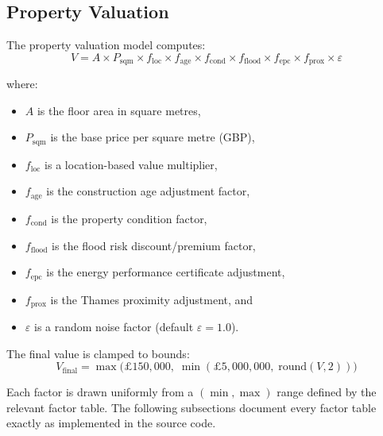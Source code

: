 \documentclass[11pt,a4paper]{article}
\begin{document}
\mkmframework

\subsection{Property Valuation}

The property valuation model computes:
\begin{equation}
\label{eq:valuation}
V = A \times P_{\mathrm{sqm}} \times f_{\mathrm{loc}} \times f_{\mathrm{age}}
    \times f_{\mathrm{cond}} \times f_{\mathrm{flood}} \times f_{\mathrm{epc}}
    \times f_{\mathrm{prox}} \times \varepsilon
\end{equation}

\noindent where:
\begin{itemize}[nosep]
    \item $A$ is the floor area in square metres,
    \item $P_{\mathrm{sqm}}$ is the base price per square metre (GBP),
    \item $f_{\mathrm{loc}}$ is a location-based value multiplier,
    \item $f_{\mathrm{age}}$ is the construction age adjustment factor,
    \item $f_{\mathrm{cond}}$ is the property condition factor,
    \item $f_{\mathrm{flood}}$ is the flood risk discount/premium factor,
    \item $f_{\mathrm{epc}}$ is the energy performance certificate adjustment,
    \item $f_{\mathrm{prox}}$ is the Thames proximity adjustment, and
    \item $\varepsilon$ is a random noise factor (default $\varepsilon = 1.0$).
\end{itemize}

\noindent The final value is clamped to bounds:
\begin{equation}
V_{\mathrm{final}} = \max\bigl(\pounds150{,}000,\;\min(\pounds5{,}000{,}000,\;\text{round}(V, 2))\bigr)
\end{equation}

Each factor is drawn uniformly from a $(\min, \max)$ range defined by the
relevant factor table. The following subsections document every factor table
exactly as implemented in the source code.
\end{document}
